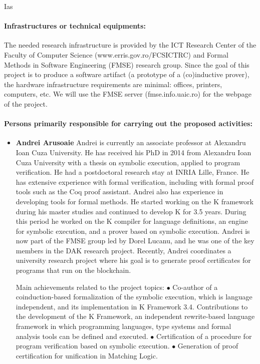 \begin{sitedescription}{Ias}
\paragraph*{Infrastructures or technical equipments:}

The needed research infrastructure is provided by the ICT Research Center of the Faculty of Computer Science (www.erris.gov.ro/FCSICTRC) and Formal Methods in Software Engineering (FMSE) research group. Since the goal of this project is to produce a software artifact (a prototype of a (co)inductive prover), the hardware infrastructure requirements are minimal: offices, printers, computers, etc. We will use the FMSE server (fmse.info.uaic.ro) for the webpage of the project. 

\paragraph*{Persons primarily responsible for carrying out the proposed activities:}

\begin{itemize} %
\item{\bf Andrei Arusoaie}
Andrei is currently an associate professor at Alexandru Ioan Cuza University. He has received his PhD in 2014 from Alexandru Ioan Cuza University with a thesis on symbolic execution, applied to program verification. He had a postdoctoral research stay at INRIA Lille, France. He has extensive experience with formal verification, including with formal proof tools such as the Coq proof assistant. Andrei also has experience in developing tools for formal methods. He started working on the K framework during his master studies and continued to develop K for 3.5 years. During this period he worked on the K compiler for language definitions, an engine for symbolic execution, and a prover based on symbolic execution. 
Andrei is now part of the FMSE group led by Dorel Lucanu, and he was one of the key members in the DAK research project. Recently, Andrei coordinates a university  research project where his goal is to generate proof certificates for programs that run on the blockchain.

Main achievements related to the project topics:
$\bullet$ Co-author of a coinduction-based formalization of the symbolic execution, which is language independent, and its implementation in K Framework 3.4.
Contributions to the development of the K Framework, an independent rewrite-based language framework in which programming languages, type systems and formal analysis tools can be defined and executed.
$\bullet$ Certification of a procedure for program verification based on symbolic execution.
$\bullet$ Generation of proof certification for unification in Matching Logic.


\end{itemize}
\end{sitedescription}

